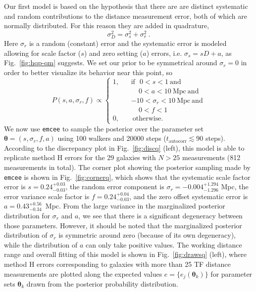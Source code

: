 \documentclass[a4paper,fleqn,usenatbib]{mnras}
\begin{document}
Our first model is based on the hypothesis that there are are distinct systematic and random contributions to the distance measurement error, both of which are normally distributed. For this reason they are added in quadrature, 
\begin{equation}
\sigma_D^2=\sigma_s^2+\sigma_r^2\ .
	\label{eq:bayq}
\end{equation}
Here $\sigma_r$ is a random (constant) error and the systematic error is modeled allowing for scale factor ($s$) and zero setting ($a$) errors, i.e.  $\sigma_s=sD+a$, as Fig.~\ref{fig:hqp-qm} suggests.  We set our prior to be symmetrical around $\sigma_r=0$ in order to better visualize its behavior near this point, so
\begin{equation}
P(s,a,\sigma_r,f)\propto\left\{
\begin{aligned}
1,\ \ \ \ &\mathrm{if}\ \ \ 0<s<1\ \mathrm{and}\\
& \ \ \ \ \  0<a<10\ \mathrm{Mpc}\ \mathrm{and}\\
&-10<\sigma_r<10\ \mathrm{Mpc}\ \mathrm{and}\\
& \ \ \ \ \  0<f<1\\
0,\ \ \ \ &\ \mathrm{otherwise.}
\end{aligned}
\right.
	\label{eq:priorq}
\end{equation}
We now use \texttt{emcee} to sample the posterior over the parameter set $\pmb{\theta}=(s,\sigma_r,f,a)$ using 100 walkers and 20000 steps ($t_\mathrm{autocorr} \lesssim 90$ steps). According to the discrepancy plot in Fig.~\ref{fig:discq} (left), this model is able to replicate method H errors for the 29 galaxies with $N>25$ measurements (812 measurements in total). The corner plot showing the posterior sampling made by \texttt{emcee} is shown in Fig.~\ref{fig:cornerq}, which shows that the systematic scale factor error is $s=0.24_{-0.03}^{+0.03}$, the random error component is $\sigma_r=-0.004_{-1.296}^{+1.294}$ Mpc, the error variance scale factor is $f=0.24_{-0.03}^{+0.04}$, and the zero offset systematic error is $a=0.43_{-0.34}^{+0.56}$\ Mpc. From the large variance in the marginalized posterior distribution for $\sigma_r$ and $a$, we see that there is a significant degeneracy between those parameters. However, it should be noted that the marginalized posterior distribution of $\sigma_r$ is symmetric around zero (because of its own degeneracy), while the distribution of $a$ can only take positive values. The working distance range and overall fitting of this model is shown in Fig.~\ref{fig:drawsq} (left), where method H errors corresponding to galaxies with more than 25 TF distance measurements are plotted along the expected values $e=\{e_j(\pmb{\theta}_k)\}$ for parameter sets $\pmb{\theta}_k$ drawn from the posterior probability distribution. 
\end{document}
